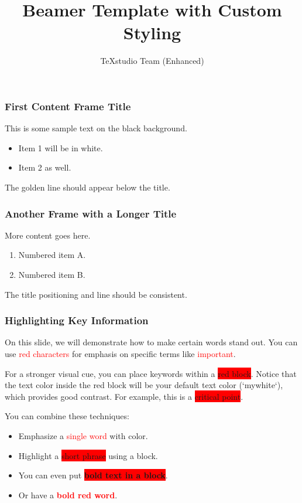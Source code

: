 \documentclass[12pt]{beamer} %
\title{Beamer Template with Custom Styling}
\author{TeXstudio Team (Enhanced)}
\date{} %
\begin{document}
	
	\begin{frame}[plain]
		\maketitle 
	\end{frame}
	
	\begin{frame}
		\frametitle{First Content Frame Title}
		This is some sample text on the black background.
		\begin{itemize}
			\item Item 1 will be in white.
			\item Item 2 as well.
		\end{itemize}
		The golden line should appear below the title.
	\end{frame}
	
	\begin{frame}
		\frametitle{Another Frame with a Longer Title}
		More content goes here.
		\begin{enumerate}
			\item Numbered item A.
			\item Numbered item B.
		\end{enumerate}
		The title positioning and line should be consistent.
	\end{frame}
	
	\begin{frame}
		\frametitle{Highlighting Key Information} %
		
		On this slide, we will demonstrate how to make certain words stand out.
		You can use \textcolor{red}{red characters} for emphasis on specific terms like \textcolor{red}{important}.
		
		For a stronger visual cue, you can place keywords within a \colorbox{red}{red block}.
		Notice that the text color inside the red block will be your default text color (`mywhite`), which provides good contrast. For example, this is a \colorbox{red}{critical point}.
		
		You can combine these techniques:
		\begin{itemize}
			\item Emphasize a \textcolor{red}{single word} with color.
			\item Highlight a \colorbox{red}{short phrase} using a block.
			\item You can even put \textbf{\colorbox{red}{bold text in a block}}.
			\item Or have a \textcolor{red}{\textbf{bold red word}}.
		\end{itemize}
		
		
	\end{frame}
	
\end{document}
